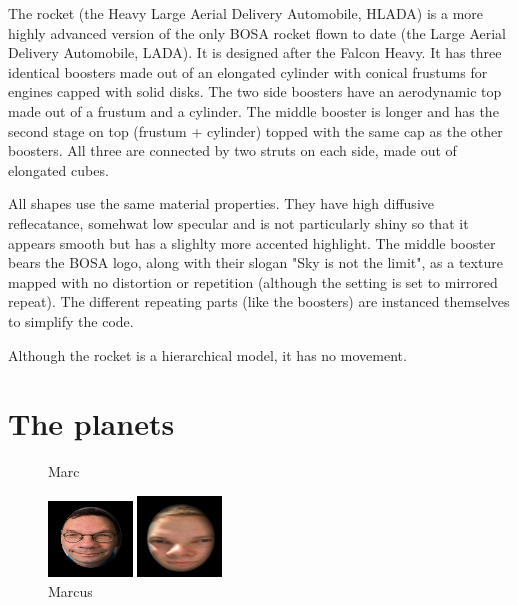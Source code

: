 \documentclass[10pt]{article}
\begin{document}
        The rocket (the Heavy Large Aerial Delivery Automobile, HLADA) is a
        more highly advanced version of the only BOSA rocket flown to date (the
        Large Aerial Delivery Automobile, LADA). It is designed after the
        Falcon Heavy. It has three identical boosters made out of an elongated
        cylinder with conical frustums for engines capped with solid disks. The
        two side boosters have an aerodynamic top made out of a frustum and a
        cylinder. The middle booster is longer and has the second stage on top
        (frustum + cylinder) topped with the same cap as the other boosters.
        All three are connected by two struts on each side, made out of
        elongated cubes.

        All shapes use the same material properties. They have high diffusive
        reflecatance, somehwat low specular and is not particularly shiny so
        that it appears smooth but has a slighlty more accented highlight. The
        middle booster bears the BOSA logo, along with their slogan "Sky is not
        the limit", as a texture mapped with no distortion or repetition
        (although the setting is set to mirrored repeat). The different
        repeating parts (like the boosters) are instanced themselves to
        simplify the code.

        Although the rocket is a hierarchical model, it has no movement.


    \section{The planets}

        \begin{figure}
                \caption{Marc}
                \includegraphics[width=0.2\textwidth]{marc}
                \caption{Marcus}
                \includegraphics[width=0.2\textwidth]{Marcus}
        \end{figure}
\end{document}
